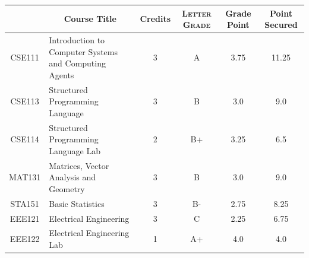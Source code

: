 \documentclass[11pt]{article}
\newcommand*{\numtwo}[1]{\pgfmathprintnumber[
                    fixed, precision=2, fixed zerofill=true]{#1}}
\begin{document}
                \begin{center}
                    \renewcommand{\arraystretch}{1.08}
                    
                \begin{tabular}{|c|l|c|>{\scshape}c|c|c|}
                \hline  \rule[-1ex]{0pt}{3.5ex} {\centering{\bf Course Code}} &  \multicolumn{1}{c|}{\textbf{Course Title}}  & {\bf Credits} & {\bf Letter Grade} & {\bf Grade Point} & {\bf Point Secured}  \\ 
                \hline   CSE111 &  Introduction to Computer Systems and Computing Agents		 & 3 & A & 3.75 & 11.25 \\ %
                \hline   CSE113 &  Structured Programming Language		 & 3 & B & 3.0 & 9.0 \\ %
                \hline   CSE114 &  Structured Programming Language Lab		 & 2 & B+ & 3.25 & 6.5 \\ %
                \hline   MAT131 &  Matrices, Vector Analysis and Geometry		 & 3 & B & 3.0 & 9.0 \\ %
                \hline   STA151 &  Basic Statistics		 & 3 & B- & 2.75 & 8.25 \\ %
                \hline   EEE121 &  Electrical Engineering		 & 3 & C & 2.25 & 6.75 \\ %
                \hline   EEE122 &  Electrical Engineering Lab		 & 1 & A+ & 4.0 & 4.0 \\ %

\hline                %
                \end{tabular}
                \end{center}
                \renewcommand{\arraystretch}{1.03}
\end{document}
